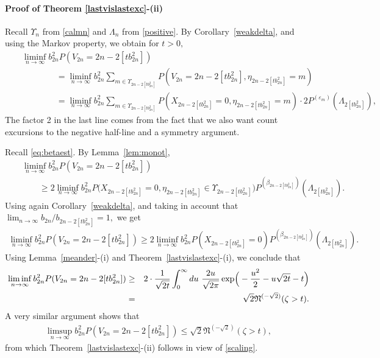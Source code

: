 \documentclass[12pt]{amsart}
\begin{document}
\paragraph{\bf Proof of Theorem \ref{lastvislastexc}-(ii)}
\label{lastagain}
Recall $\Upsilon_n$ from \eqref{calmn} and $\Lambda_n$ from \eqref{positive}.
By Corollary~\ref{weakdelta}, and using the Markov property, we
obtain for $t>0,$
\begin{eqnarray}
\nonumber
&& \liminf_{n\to\infty} b_{2n}^2 P(V_{2n}=2n-2[tb_{2n}^2])
\\
\nonumber
&& \qquad \qquad =\liminf_{n\to\infty} b_{2n}^2 \sum_{m\in \Upsilon_{2n-2[tb_{2n}^2]}} P(V_{2n}=2n-2[tb_{2n}^2], \eta_{2n-2[tb_{2n}^2]}=m)
\\
\label{llimit}
&&
\qquad \qquad =\liminf_{n\to\infty} b_{2n}^2 \sum_{m\in \Upsilon_{2n-2[tb_{2n}^2]}}
P(X_{2n-2[tb_{2n}^2]}=0,\eta_{2n-2[tb_{2n}^2]}=m)\cdot 2P^{({\varepsilon}_m)}(\Lambda_{2[tb_{2n}^2]}),
\end{eqnarray}
The factor 2 in the last line comes from the fact that we also want count excursions to the negative half-line
and a symmetry argument.
\par
Recall \eqref{eq:betaest}. By Lemma~\ref{lem:monot},
\begin{eqnarray*}
&& \liminf_{n
\to \infty} b_{2n}^2 P(V_{2n}=2n-2[tb_{2n}^2]) \\ \nonumber && \qquad \geq
2\liminf_{n \to \infty} b_{2n}^2 P\bigl( X_{2n-2[tb_{2n}^2]}=0,
\eta_{2n-2[tb_{2n}^2]} \in \Upsilon_{2n-2[tb_{2n}^2]} \bigr) P^{(\beta_{2n-2[tb_{2n}^2]})}(\Lambda_{2[tb_{2n}^2]}).
\end{eqnarray*}
Using again Corollary~\ref{weakdelta}, and taking in account that
$\lim_{n\to\infty} b_{2n}/b_{2n-2[tb_{2n}^2]}=1,$ we get
\begin{eqnarray*}
\liminf_{n \to \infty} b_{2n}^2 P(V_{2n}=2n-2[tb_{2n}^2]) \geq
2 \liminf_{n \to \infty} b_{2n}^2 P( X_{2n-2[tb_{2n}^2]}=0) P^{(\beta_{2n-2[tb_{2n}^2]})}(\Lambda_{2[tb_{2n}^2]}).
\end{eqnarray*}
Using Lemma~\ref{meander}-(i) and Theorem~\ref{lastvislastexc}-(i), we conclude that
\begin{eqnarray*}
\liminf_{n \to \infty} b_{2n}^2 P(V_{2n}=2n-2[tb_{2n}^2]) &\geq&
2\cdot {\frac {\displaystyle {1}}{\displaystyle {\sqrt{2t}} }}\int_0^{\infty} du \
\frac{2u}{\sqrt{2\pi }} \exp \Bigr(-\frac{u^2}{2} - u \sqrt{2t} -t \Bigl)
\\
&=& \sqrt{2} {{\mathfrak N}}^{(-\sqrt{2})}(\zeta>t).
\end{eqnarray*}
A very similar argument shows that
\begin{eqnarray*}
\limsup_{n \to \infty} b_{2n}^2 P(V_{2n}=2n-2[tb_{2n}^2]) \leq  \sqrt{2} {{\mathfrak N}}^{(-\sqrt{2})}(\zeta>t),
\end{eqnarray*}
from which Theorem~\ref{lastvislastexc}-(ii) follows in view of \eqref{scaling}.
\\
$\mbox{}$
\end{document}
